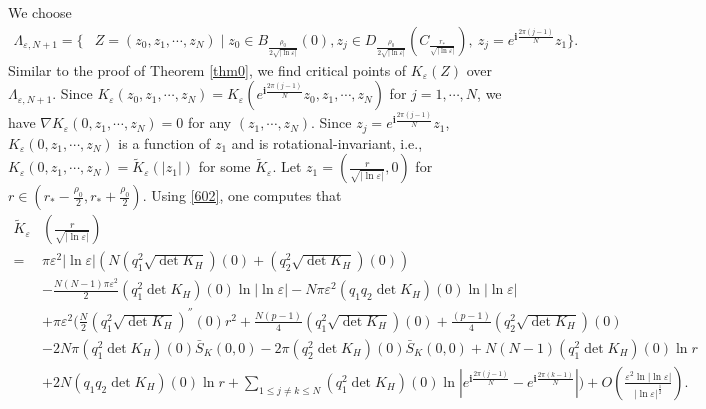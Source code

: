 \documentclass[12pt,reqno]{amsart}
\numberwithin{equation}{section}
\theoremstyle{definition}
\theoremstyle{remark}
\begin{document}
We choose 
\begin{equation*} 
\begin{split}
\Lambda_{\varepsilon, N+1}=\bigg\{&Z=(z_0, z_1,\cdots, z_N) \mid z_0\in B_{\frac{\rho_0}{2\sqrt{|\ln\varepsilon|}}}\left (0\right ), z_j\in D_{\frac{\rho_0}{2\sqrt{|\ln\varepsilon|}}}\left (C_{\frac{r_*}{\sqrt{|\ln\varepsilon|}}}\right ),\   z_j=e^{\textbf{i}\frac{2\pi(j-1)}{N}}z_1\bigg\}.
\end{split}
\end{equation*}
Similar to the proof of Theorem \ref{thm0}, we find critical points of $ K_\varepsilon(Z) $ over $ \Lambda_{\varepsilon, N+1} $. Since $ K_\varepsilon\left (z_0, z_1,\cdots, z_N\right )=K_\varepsilon\left (e^{\textbf{i}\frac{2\pi(j-1)}{N}}z_0, z_1,\cdots, z_N\right ) $ for $ j=1,\cdots,N $, we have $\nabla K_\varepsilon(0, z_1,\cdots, z_N)=0$ for any $ (z_1,\cdots,z_N) $.  Since $ z_j=e^{\textbf{i}\frac{2\pi(j-1)}{N}}z_1 $,   $ K_\varepsilon(0,z_1,\cdots,z_N) $ is a   function of $ z_1 $ %
and is rotational-invariant, i.e., $ K_\varepsilon(0,z_1,\cdots,z_N)=\tilde{K}_\varepsilon(|z_1|) $ for some $ \tilde{K}_\varepsilon $. Let $ z_1=\left( \frac{r}{\sqrt{|\ln\varepsilon|}},0\right)  $ for $ r\in \left (r_*-\frac{\rho_0}{2},r_*+\frac{\rho_0}{2} \right ) $. %
Using \eqref{602}, one computes that
\begin{equation} \label{702}
\begin{split}
\tilde{K}_\varepsilon&\left (\frac{r}{\sqrt{|\ln\varepsilon|}}\right )\\
=&\pi\varepsilon^2|\ln\varepsilon|\left( N\left( q_1^2\sqrt{\det K_H}\right)(0)+\left( q_2^2\sqrt{\det K_H}\right)(0)\right) \\
&-\frac{N(N-1)\pi\varepsilon^2}{2}\left( q_1^2 \det K_H \right)(0)\ln|\ln\varepsilon|-N\pi\varepsilon^2\left( q_1q_2 \det K_H \right)(0)\ln|\ln\varepsilon|\\
&+\pi\varepsilon^2\bigg(  \frac{N}{2} \left(q_1^2\sqrt{\det K_H} \right)^{''}(0 )r^2+ \frac{N(p-1)}{4}   \left( q_1^2\sqrt{\det K_H}\right) (0)+ \frac{(p-1)}{4}   \left( q_2^2\sqrt{\det K_H}\right) (0)     \\
&-2N\pi   \left( q_1^2  \det K_H\right)(0) \bar{S}_K(0,0)-2\pi   \left( q_2^2  \det K_H\right)(0) \bar{S}_K(0,0)+N(N-1)\left( q_1^2  \det K_H\right)(0)\ln r\\
&+2N\left( q_1q_2 \det K_H\right)(0)\ln r+\sum_{1\leq j\neq k\leq N}\left( q_1^2  \det K_H\right)(0)\ln| e^{\textbf{i}\frac{2\pi(j-1)}{N}} - e^{\textbf{i}\frac{2\pi(k-1)}{N}} |\bigg)  
+O\left( \frac{\varepsilon^2\ln|\ln\varepsilon|}{|\ln\varepsilon|^{\frac{1}{2}}}\right).
\end{split}
\end{equation}
\end{document}

